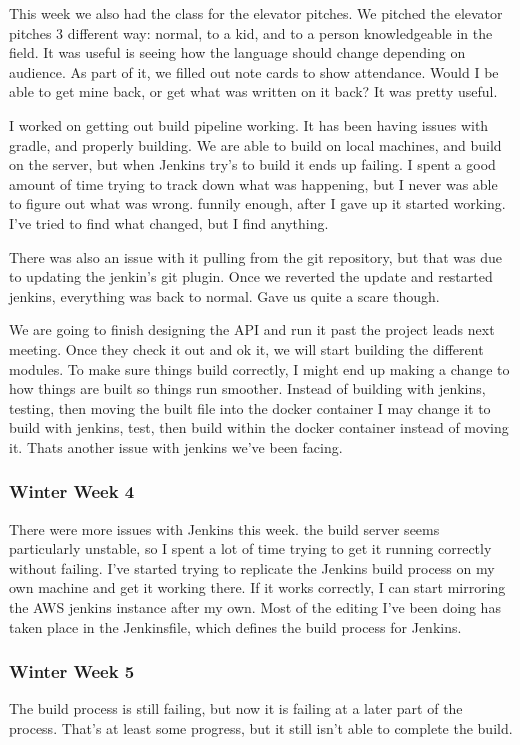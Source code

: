 \documentclass[onecolumn, draftclsnofoot,10pt, compsoc]{IEEEtran}
\begin{document}
This week we also had the class for the elevator pitches.  We pitched the elevator pitches 3 different way: normal, to a kid, and to a person knowledgeable in the field.  It was useful is seeing how the language should change depending on audience.  As part of it, we filled out note cards to show attendance.  Would I be able to get mine back, or get what was written on it back?  It was pretty useful.

I worked on getting out build pipeline working.  It has been having issues with gradle, and properly building.  We are able to build on local machines, and build on the server, but when Jenkins try's to build it ends up failing.  I spent a good amount of time trying to track down what was happening, but I never was able to figure out what was wrong.  funnily enough, after I gave up it started working.  I've tried to find what changed, but I find anything.

There was also an issue with it pulling from the git repository, but that was due to updating the jenkin's git plugin.  Once we reverted the update and restarted jenkins, everything was back to normal. Gave us quite a scare though.

We are going to finish designing the API and run it past the project leads next meeting.  Once they check it out and ok it, we will start building the different modules.  To make sure things build correctly, I might end up making a change to how things are built so things run smoother.  Instead of building with jenkins, testing, then moving the built file into the docker container I may change it to build with jenkins, test, then build within the docker container instead of moving it.  Thats another issue with jenkins we've been facing.

\subsubsection*{Winter Week 4}
There were more issues with Jenkins this week.  the build server seems particularly unstable, so I spent a lot of time trying to get it running correctly without failing.  I've started trying to replicate the Jenkins build process on my own machine and get it working there.  If it works correctly, I can start mirroring the AWS jenkins instance after my own.  Most of the editing I've been doing has taken place in the Jenkinsfile, which defines the build process for Jenkins.

\subsubsection*{Winter Week 5}
The build process is still failing, but now it is failing at a later part of the process.  
That's at least some progress, but it still isn't able to complete the build.
\end{document}
